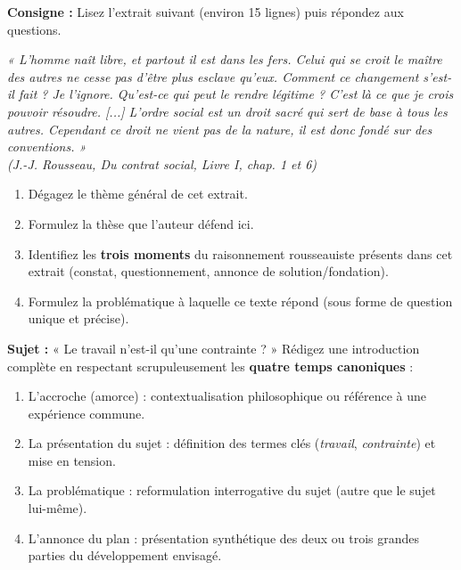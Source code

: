 \documentclass[11pt]{article}
\newcommand{\cle}[1]{{\popxbold\color{popdark}#1}}
\begin{document}
\begin{exercice}
\textbf{Consigne :} Lisez l'extrait suivant (environ 15 lignes) puis répondez aux questions.

\textit{« L'homme naît libre, et partout il est dans les fers. Celui qui se croit le maître des autres ne cesse pas d'être plus esclave qu'eux. Comment ce changement s'est-il fait ? Je l'ignore. Qu'est-ce qui peut le rendre légitime ? C'est là ce que je crois pouvoir résoudre. [...] L'ordre social est un droit sacré qui sert de base à tous les autres. Cependant ce droit ne vient pas de la nature, il est donc fondé sur des conventions. »} \\
\textit{(J.-J. Rousseau, \emph{Du contrat social}, Livre I, chap. 1 et 6)}

\begin{enumerate}
\item Dégagez le \cle{thème} général de cet extrait.
\item Formulez la \cle{thèse} que l'auteur défend ici.
\item Identifiez les \textbf{trois moments} du raisonnement rousseauiste présents dans cet extrait (constat, questionnement, annonce de solution/fondation).
\item Formulez la \cle{problématique} à laquelle ce texte répond (sous forme de question unique et précise).
\end{enumerate}
\end{exercice}

\begin{exercice}
\textbf{Sujet :} « Le travail n'est-il qu'une contrainte ? »
Rédigez une introduction complète en respectant scrupuleusement les \textbf{quatre temps canoniques} :
\begin{enumerate}
\item L'accroche (amorce) : contextualisation philosophique ou référence à une expérience commune.
\item La présentation du sujet : définition des termes clés (\emph{travail}, \emph{contrainte}) et mise en tension.
\item La problématique : reformulation interrogative du sujet (autre que le sujet lui-même).
\item L'annonce du plan : présentation synthétique des deux ou trois grandes parties du développement envisagé.
\end{enumerate}
\end{exercice}
\end{document}
